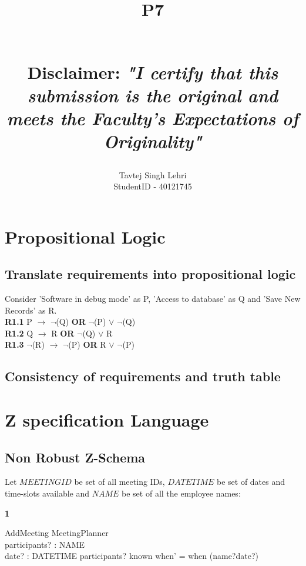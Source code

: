 \documentclass[fuzz]{article}
\title{\normalsize \texts{SOEN 6481 Summer 2021}\\ [1.0cm]
\large \textbf{\uppercase{P7}}\\
\normalsize \vspace*{2\baselineskip}\\
\author{{Tavtej Singh Lehri\\
StudentID - 40121745}}

\textbf{Disclaimer:}
\textit{"I certify that this submission is the original and meets the Faculty's Expectations of Originality"}
}
\begin{document}
\maketitle

\tableofcontents
\clearpage

\section{Propositional Logic}
\subsection{Translate requirements into propositional logic}
Consider 'Software in debug mode' as P, 'Access to database' as Q and 'Save New Records' as R.\\[0.3cm]
\textbf{R1.1} P $\rightarrow$ $\neg$(Q) \textbf{OR} $\neg$(P) $\lor$ $\neg$(Q)\\[0.3cm]
\textbf{R1.2} Q $\rightarrow$ R \textbf{OR} $\neg$(Q) $\lor$ R\\[0.3cm]
\textbf{R1.3} $\neg$(R) $\rightarrow$ $\neg$(P) \textbf{OR} R $\lor$ $\neg$(P)

\subsection{Consistency of requirements and truth table}

\section{Z specification Language}
\subsection{Non Robust Z-Schema}

\noindent Let $MEETINGID$ be set of all meeting IDs, $DATETIME$ be set of dates and time-slots available and $NAME$ be set of all the employee names:

\begin{zed}
\end{zed}

\textbf{1}
\begin{schema}{AddMeeting}
\Delta MeetingPlanner \\
participants? : NAME \\
date? : DATETIME
\where
participants? \notin known
\also
when' = when \bigcup (name?\pfun date?)
\end{schema}
\end{document}
